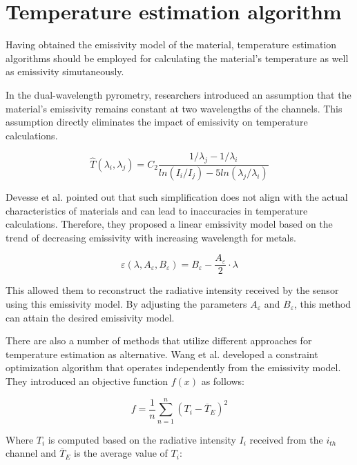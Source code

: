 \section{Temperature estimation algorithm}
Having obtained the emissivity model of the material, temperature estimation 
algorithms should be employed for calculating the material's 
temperature as well as emissivity simutaneously.


In the dual-wavelength pyrometry, researchers introduced an assumption 
that the material's emissivity remains constant at two 
wavelengths of the channels. This assumption directly eliminates the 
impact of emissivity on temperature calculations\cite{Grujic.2023}.

\begin{equation}
    \widehat{T}(\lambda_i, \lambda_j)=C_2 \frac{1/\lambda_j - 1/\lambda_i}{ln(I_i/I_j) - 5ln(\lambda_j / \lambda_i)}
\end{equation}

Devesse et al. pointed out that such simplification does not align 
with the actual characteristics of materials and can lead to inaccuracies 
in temperature calculations\cite{Devesse.2017}. Therefore, they proposed 
a linear emissivity model based on the trend of decreasing emissivity with 
increasing wavelength for metals. 

\begin{equation}
    \varepsilon(\lambda, A_{\varepsilon}, B_{\varepsilon}) = B_{\varepsilon} - \frac{A_{\varepsilon}}{2} \cdot \lambda
\end{equation}

This allowed them to reconstruct the 
radiative intensity received by the sensor using this emissivity model.
By adjusting the parameters $A_{\varepsilon}$ and $B_{\varepsilon}$, this 
method can attain the desired emissivity model.


There are also a number of methods that utilize different approaches for temperature
estimation as alternative.
Wang et al. developed a constraint optimization algorithm that 
operates independently from the emissivity model\cite{Wang.2021b}. They 
introduced an objective function $f(x)$ as follows:

\begin{equation}
    \label{eq: fun_wang_2021b}
    f=\frac{1}{n}\sum_{n = 1}^{n}\left(T_i - \overline{T}_E \right)^2  
\end{equation}

Where $T_i$ is computed based on the radiative intensity $I_i$ received from 
the $i_{th}$ channel and $\overline{T}_E$ is the average value of $T_i$:

